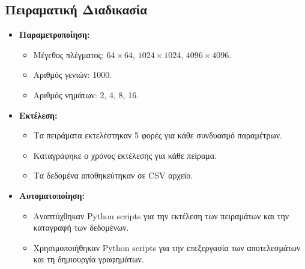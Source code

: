 \documentclass{article}
\begin{document}
\subsection*{Πειραματική Διαδικασία} 
\begin{itemize} 
    \item \textbf{Παραμετροποίηση:} 
    \begin{itemize} 
        \item Μέγεθος πλέγματος: $64 \times 64$, $1024 \times 1024$, $4096 \times 4096$. 
        \item Αριθμός γενιών: 1000. 
        \item Αριθμός νημάτων: 2, 4, 8, 16. 
    \end{itemize} 
    \item \textbf{Εκτέλεση:} 
    \begin{itemize} 
        \item Τα πειράματα εκτελέστηκαν 5 φορές για κάθε συνδυασμό παραμέτρων. 
        \item Καταγράφηκε ο χρόνος εκτέλεσης για κάθε πείραμα. 
        \item Τα δεδομένα αποθηκεύτηκαν σε CSV αρχείο. 
    \end{itemize} 
    \item \textbf{Αυτοματοποίηση:} 
    \begin{itemize} 
        \item Αναπτύχθηκαν Python scripts για την εκτέλεση των πειραμάτων και την καταγραφή των δεδομένων. 
        \item Χρησιμοποιήθηκαν Python scripts για την επεξεργασία των αποτελεσμάτων και τη δημιουργία γραφημάτων. 
    \end{itemize} 
\end{itemize}
\end{document}
